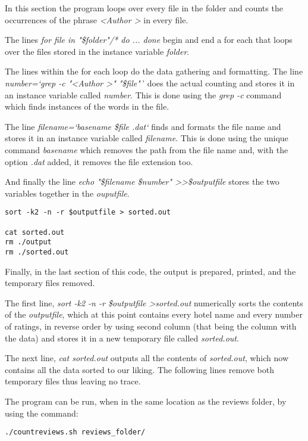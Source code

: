 \documentclass{article}
\begin{document}
In this section the program loops over every file in the folder and counts the occurrences of the phrase \textit{\textless Author \textgreater} in every file. \par The lines \textit{for file in "\$folder"/* do ... done} begin and end a for each that loops over the files stored in the instance variable \textit{folder}. \par The lines within the for each loop do the data gathering and formatting. The line \textit{number=`grep -c "\textless Author \textgreater" "\$file"`} does the actual counting and stores it in an instance variable called \textit{number}. This is done using the \textit{grep -c} command which finds instances of the words in the file. \par The line \textit{filename=`basename \$file .dat`} finds and formats the file name and stores it in an instance variable called \textit{filename}. This is done using the unique command \textit{basename} which removes the path from the file name and, with the option \textit{.dat} added, it removes the file extension too. \par And finally the line \textit{echo "\$filename \$number" \textgreater \textgreater \$outputfile} stores the two variables together in the \textit{ouputfile}.

\begin{lstlisting}
sort -k2 -n -r $outputfile > sorted.out

cat sorted.out
rm ./output
rm ./sorted.out
\end{lstlisting}

Finally, in the last section of this code, the output is prepared, printed, and the temporary files removed. \par The first line, \textit{sort -k2 -n -r \$outputfile \textgreater sorted.out} numerically sorts the contents of the \textit{outputfile}, which at this point contains every hotel name and every number of ratings, in reverse order by using second column (that being the column with the data) and stores it in a new temporary file called \textit{sorted.out}. \par The next line, \textit{cat sorted.out} outputs all the contents of \textit{sorted.out}, which now contains all the data sorted to our liking. The following lines remove both temporary files thus leaving no trace. \par The program can be run, when in the same location as the reviews folder, by using the command:

\begin{lstlisting}
./countreviews.sh reviews_folder/
\end{lstlisting}
\end{document}
